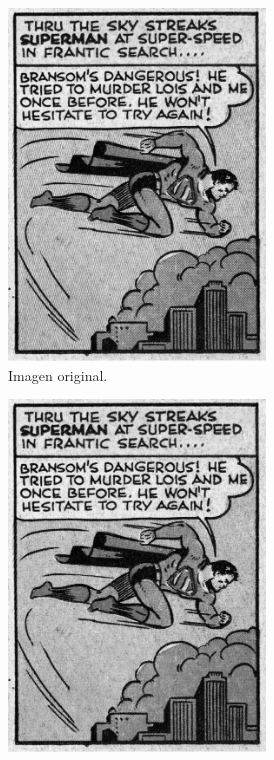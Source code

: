\documentclass[letterpaper,12pt]{article}
\theoremstyle{plain}
\begin{document}
\begin{figure}[H]
    \centering
         \begin{subfigure}[h]{0.49\textwidth}
            \centering
            \includegraphics[width=0.75\textwidth]{Figuras/superman.png}
            \caption{Imagen original.} \label{fig:supermana}
         \end{subfigure}
         \begin{subfigure}[h]{0.49\textwidth}
            \centering
            \includegraphics[width=0.75\textwidth]{Figuras/Inverse FFT of superman_process.png}

\end{subfigure}
\end{figure}
\end{document}
